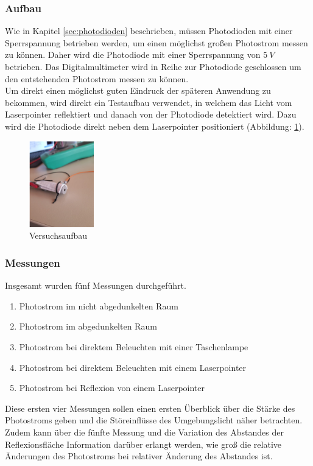 \subsubsection{Aufbau}
Wie in Kapitel \ref{sec:photodioden} beschrieben, müssen Photodioden mit einer Sperrspannung betrieben werden, um einen möglichst großen Photostrom messen zu können. Daher wird die Photodiode mit einer Sperrspannung von $5\:V$ betrieben. Das Digitalmultimeter wird in Reihe zur Photodiode geschlossen um den entstehenden Photostrom messen zu können.\\
Um direkt einen möglichst guten Eindruck der späteren Anwendung zu bekommen, wird direkt ein Testaufbau verwendet, in welchem das Licht vom Laserpointer reflektiert und danach von der Photodiode detektiert wird. Dazu wird die Photodiode direkt neben dem Laserpointer positioniert (Abbildung: \ref{versuch1_versuchsaufbau}). 
\begin{figure}[H]
	\centering
	\includegraphics[width=0.25\textwidth]{images/Machbarkeitsstudie/Versuch1_Aufbau}	
	\caption{Versuchsaufbau}
	\label{versuch1_versuchsaufbau}
\end{figure}
\subsubsection{Messungen}
Insgesamt wurden fünf Messungen durchgeführt.
\begin{enumerate}
	\item Photostrom im nicht abgedunkelten Raum
	\item Photostrom im abgedunkelten Raum
	\item Photostrom bei direktem Beleuchten mit einer Taschenlampe
	\item Photostrom bei direktem Beleuchten mit einem Laserpointer
	\item Photostrom bei Reflexion von einem Laserpointer
\end{enumerate}
Diese ersten vier Messungen sollen einen ersten Überblick über die Stärke des Photostroms geben und die Störeinflüsse des Umgebungslicht näher betrachten. Zudem kann über die fünfte Messung und die Variation des Abstandes der Reflexionsfläche Information darüber erlangt werden, wie groß die relative Änderungen des Photostroms bei relativer Änderung des Abstandes ist.
